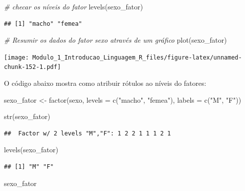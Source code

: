 \documentclass[
]{article}
\newenvironment{Shaded}{\begin{snugshade}}{\end{snugshade}}
\newcommand{\AttributeTok}[1]{\textcolor[rgb]{0.77,0.63,0.00}{#1}}
\newcommand{\CommentTok}[1]{\textcolor[rgb]{0.56,0.35,0.01}{\textit{#1}}}
\newcommand{\FunctionTok}[1]{\textcolor[rgb]{0.00,0.00,0.00}{#1}}
\newcommand{\NormalTok}[1]{#1}
\newcommand{\OtherTok}[1]{\textcolor[rgb]{0.56,0.35,0.01}{#1}}
\newcommand{\StringTok}[1]{\textcolor[rgb]{0.31,0.60,0.02}{#1}}
\begin{document}
\begin{Shaded}
\begin{Highlighting}[]
\CommentTok{\# checar os níveis do fator}
\FunctionTok{levels}\NormalTok{(sexo\_fator)}
\end{Highlighting}
\end{Shaded}

\begin{verbatim}
## [1] "macho" "femea"
\end{verbatim}

\begin{Shaded}
\begin{Highlighting}[]
\CommentTok{\# Resumir os dados do fator sexo através de um gráfico}
\FunctionTok{plot}\NormalTok{(sexo\_fator)}
\end{Highlighting}
\end{Shaded}

\texttt{[image: Modulo\_1\_Introducao\_Linguagem\_R\_files/figure-latex/unnamed-chunk-152-1.pdf]}

O código abaixo mostra como atribuir rótulos ao níveis do fatores:

\begin{Shaded}
\begin{Highlighting}[]
\NormalTok{sexo\_fator }\OtherTok{\textless{}{-}} \FunctionTok{factor}\NormalTok{(sexo, }\AttributeTok{levels =} \FunctionTok{c}\NormalTok{(}\StringTok{"macho"}\NormalTok{, }\StringTok{"femea"}\NormalTok{), }
                     \AttributeTok{labels =} \FunctionTok{c}\NormalTok{(}\StringTok{"M"}\NormalTok{, }\StringTok{"F"}\NormalTok{))}

\FunctionTok{str}\NormalTok{(sexo\_fator)}
\end{Highlighting}
\end{Shaded}

\begin{verbatim}
##  Factor w/ 2 levels "M","F": 1 2 2 1 1 1 2 1
\end{verbatim}

\begin{Shaded}
\begin{Highlighting}[]
\FunctionTok{levels}\NormalTok{(sexo\_fator)}
\end{Highlighting}
\end{Shaded}

\begin{verbatim}
## [1] "M" "F"
\end{verbatim}

\begin{Shaded}
\begin{Highlighting}[]
\NormalTok{sexo\_fator}
\end{Highlighting}
\end{Shaded}
\end{document}
